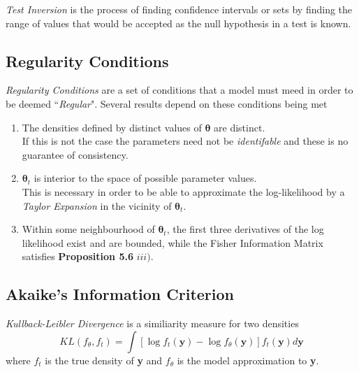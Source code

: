 \documentclass[11pt,a4paper]{article}
\begin{document}
\textit{Test Inversion}  is the process of finding confidence intervals or sets by finding the range of values that would be accepted as the null hypothesis in a test is known.

\subsection{Regularity Conditions}

\textit{Regularity Conditions} are a set of conditions that a model must meed in order to be deemed ``\textit{Regular}". Several results depend on these conditions being met
\begin{enumerate}
	\item The densities defined by distinct values of $\pmb\theta$ are distinct.\\
	If this is not the case the parameters need not be \textit{identifable} and these is no guarantee of consistency.
	\item $\pmb\theta_t$ is interior to the space of possible parameter values.\\
	This is necessary in order to be able to approximate the log-likelihood by a \textit{Taylor Expansion} in the vicinity of $\pmb\theta_t$.
	\item Within some neighbourhood of $\pmb\theta_t$, the first three derivatives of the log likelihood exist and are bounded, while the Fisher Information Matrix satisfies \textbf{Proposition 5.6} $iii)$.
\end{enumerate}

\subsection{Akaike's Information Criterion}

\textit{Kullback-Leibler Divergence} is a similiarity measure for two densities
$$KL(f_\theta,f_t)=\int[\log f_t(\textbf{y})-\log f_\theta(\textbf{y})]f_t(\textbf{y})d\textbf{y}$$
where $f_t$ is the true density of \textbf{y} and $f_\theta$ is the model approximation to \textbf{y}.\\
\end{document}
